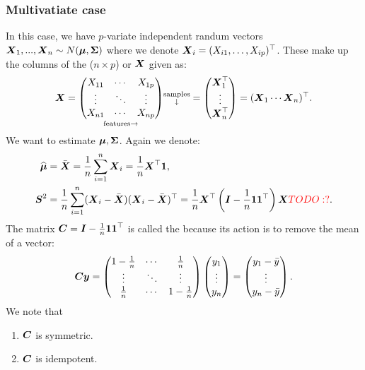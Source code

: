 \subsubsection{Multivatiate case}
In this case, we have $p$-variate independent randum vectors $\boldsymbol{X}_1,...,\boldsymbol{X}_n \sim N(\boldsymbol{\mu}, \boldsymbol{\Sigma})$ where we denote $\boldsymbol{X}_i=(X_{i1},\dots,X_{ip})^\top$. These make up the columns of the ($n\times p$)  or  $\boldsymbol{X}$ given as:
$$
    \boldsymbol{X} = 
    \underset{\mathrm{features} \rightarrow}{
    \begin{pmatrix}
        X_{11} & \cdots & X_{1p} \\
        \vdots & \ddots & \vdots \\
        X_{n1} & \cdots & X_{np}
    \end{pmatrix}}
    \substack{\text{samples} \\ \downarrow}
    = \begin{pmatrix}
        \boldsymbol{X}_1^\top \\ \vdots \\ \boldsymbol{X}_n^\top
    \end{pmatrix}= (\boldsymbol{X}_1 \cdots \boldsymbol{X}_n)^\top.
$$
We want to estimate $\boldsymbol{\mu}, \boldsymbol{\Sigma}$. Again we denote:
\begin{align*}
    \Mh &= \bar{\X} = \frac{1}{n} \sum_{i=1}^n \X_i = \frac{1}{n}\X^\top \one, \\
    \bs{S}^2 
    &= \frac{1}{n} \sum_{i=1}^n (\X_i-\bar{\X})(\X_i-\bar{\X})^\top 
    = \frac{1}{n} \X^\top\brac{\mI-\frac{1}{n} \one\one^\top}\X \TODO{?}.
\end{align*}
The matrix $\boldsymbol{C}=\boldsymbol{I}-\frac{1}{n} \boldsymbol{1}\boldsymbol{1}^\top$ is called the  because its action is to remove the mean of a vector:
$$
    \boldsymbol{C} \boldsymbol{y} = \begin{pmatrix}
        1-\frac{1}{n} & \cdots & \frac{1}{n} \\
        \vdots & \ddots & \vdots \\
        \frac{1}{n} & \cdots & 1-\frac{1}{n}
    \end{pmatrix}
    \begin{pmatrix}
        y_1 \\ \vdots \\ y_n
    \end{pmatrix}
    = 
    \begin{pmatrix}
        y_1-\bar{y} \\ \vdots \\ y_n-\bar{y}
    \end{pmatrix}.
$$
We note that 
\begin{enumerate}
    \item $\boldsymbol{C}$ is symmetric.
    \item $\boldsymbol{C}$ is idempotent.
\end{enumerate}

